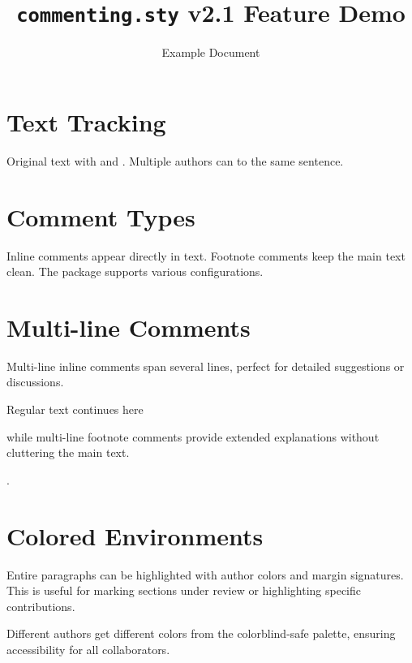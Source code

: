 \documentclass[10pt]{article}
\title{\texttt{commenting.sty} v2.1 Feature Demo}
\author{Example Document}
\date{}
\begin{document}
\maketitle
\vspace{-1em}

\section{Text Tracking}

Original text with  and . Multiple authors can  to the same sentence.

\section{Comment Types}

Inline comments appear directly in text. Footnote comments keep the main text clean. The package supports various configurations.

\section{Multi-line Comments}

\begin{aliceienv}
Multi-line inline comments span several lines,
perfect for detailed suggestions or discussions.
\end{aliceienv}

Regular text continues here\begin{bobfenv}
while multi-line footnote comments
provide extended explanations
without cluttering the main text.
\end{bobfenv}.

\section{Colored Environments}

\begin{aliceenv}
Entire paragraphs can be highlighted with author colors and margin signatures. This is useful for marking sections under review or highlighting specific contributions.
\end{aliceenv}

\begin{bobenv}
Different authors get different colors from the colorblind-safe palette, ensuring accessibility for all collaborators.
\end{bobenv}
\end{document}
